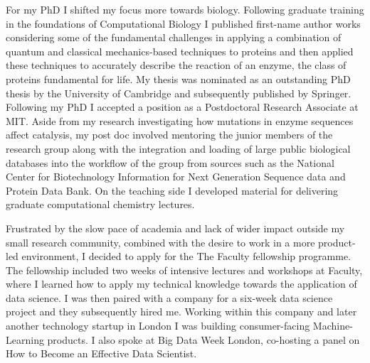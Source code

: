 \documentclass[11pt,a4paper,sans]{moderncv}        %
\begin{document}
%
For my PhD I shifted my focus more towards biology. 
%
Following graduate training in the foundations of 
Computational Biology I published first-name author
works considering some of the fundamental challenges
in applying a combination of 
quantum and classical mechanics-based techniques
to proteins\cite{jpcm} and then applied these techniques 
to accurately describe the reaction of an enzyme,
the class of proteins fundamental for life\cite{jpcl}.
%
My thesis was nominated as an outstanding
PhD thesis by the University of Cambridge
and subsequently published by 
Springer\cite{springer_thesis}.
%
Following my PhD I accepted a position as a 
Postdoctoral Research Associate at MIT\cite{mit}. 
%
Aside from my research investigating 
how mutations in enzyme sequences affect catalysis,
my post doc involved mentoring
the junior members of the research group along
with the integration and loading of 
large public biological databases 
into the workflow of the group from sources 
such as the National Center for Biotechnology 
Information for Next Generation Sequence data and 
Protein Data Bank.
%
On the teaching side I developed material for 
delivering graduate computational chemistry 
lectures.
%

%
Frustrated by the slow pace of academia
and lack of wider impact outside my 
small research community, combined with the desire to
work in a more product-led environment, I decided to apply 
for the The Faculty fellowship programme.
%
%
%
The fellowship included two weeks of 
intensive lectures and workshops at Faculty, 
where I learned how to apply 
my technical knowledge towards the application of 
data science.
% 
I was then paired with a company 
for a six-week data science project and they subsequently 
hired me.
%
Working within this company and 
later another technology startup in London
I was building consumer-facing Machine-Learning
products. 
%
I also spoke at Big Data Week London, co-hosting 
a panel on How to Become an Effective Data Scientist\cite{BDW}.
\end{document}
